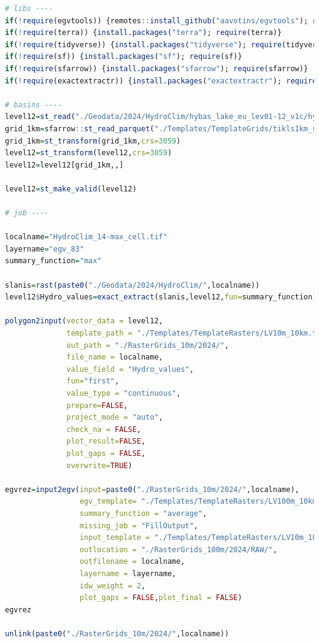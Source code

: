 \documentclass[
]{book}
\begin{document}
\begin{lstlisting}[language=R]
# libs ----
if(!require(egvtools)) {remotes::install_github("aavotins/egvtools"); require(egvtools)}
if(!require(terra)) {install.packages("terra"); require(terra)}
if(!require(tidyverse)) {install.packages("tidyverse"); require(tidyverse)}
if(!require(sf)) {install.packages("sf"); require(sf)}
if(!require(sfarrow)) {install.packages("sfarrow"); require(sfarrow)}
if(!require(exactextractr)) {install.packages("exactextractr"); require(exactextractr)}

# basins ----
level12=st_read("./Geodata/2024/HydroClim/hybas_lake_eu_lev01-12_v1c/hybas_lake_eu_lev12_v1c.shp")
grid_1km=sfarrow::st_read_parquet("./Templates/TemplateGrids/tikls1km_sauzeme.parquet")
grid_1km=st_transform(grid_1km,crs=3059)
level12=st_transform(level12,crs=3059)
level12=level12[grid_1km,,]

level12=st_make_valid(level12)

# job ----

localname="HydroClim_14-max_cell.tif"
layername="egv_83"
summary_function="max"
  
slanis=rast(paste0("./Geodata/2024/HydroClim/",localname))
level12$Hydro_values=exact_extract(slanis,level12,fun=summary_function)
  
polygon2input(vector_data = level12,
              template_path = "./Templates/TemplateRasters/LV10m_10km.tif",
              out_path = "./RasterGrids_10m/2024/",
              file_name = localname,
              value_field = "Hydro_values",
              fun="first",
              value_type = "continuous",
              prepare=FALSE,
              project_mode = "auto",
              check_na = FALSE,
              plot_result=FALSE,
              plot_gaps = FALSE,
              overwrite=TRUE)
  
egvrez=input2egv(input=paste0("./RasterGrids_10m/2024/",localname),
                 egv_template= "./Templates/TemplateRasters/LV100m_10km.tif",
                 summary_function = "average",
                 missing_job = "FillOutput",
                 input_template = "./Templates/TemplateRasters/LV10m_10km.tif",
                 outlocation = "./RasterGrids_100m/2024/RAW/",
                 outfilename = localname,
                 layername = layername,
                 idw_weight = 2,
                 plot_gaps = FALSE,plot_final = FALSE)
egvrez
  
unlink(paste0("./RasterGrids_10m/2024/",localname))
\end{lstlisting}
\end{document}
